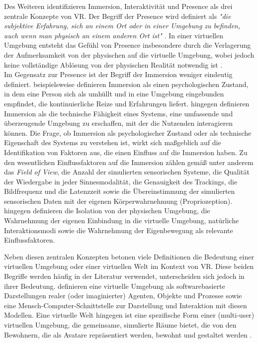 Des Weiteren identifizieren \citet{walsh_virtual_2002} Immersion, Interaktivität und Presence als drei zentrale Konzepte von VR. Der Begriff der Presence wird definiert als \textit{"die subjektive Erfahrung, sich an einem Ort oder in einer Umgebung zu befinden, auch wenn man physisch an einem anderen Ort ist"} \citep{witmer_measuring_1998}. In einer virtuellen Umgebung entsteht das Gefühl von Presence insbesondere durch die Verlagerung der Aufmerksamkeit von der physischen auf die virtuelle Umgebung, wobei jedoch keine vollständige Ablösung von der physischen Realität notwendig ist \citep{witmer_measuring_1998}. \\
Im Gegensatz zur Presence ist der Begriff der Immersion weniger eindeutig definiert. \citet{witmer_measuring_1998} beispielsweise definieren Immersion als einen psychologischen Zustand, in dem eine Person sich als umhüllt und in eine Umgebung eingebunden empfindet, die kontinuierliche Reize und Erfahrungen liefert. \citet{sanchez-vives_presence_2005} hingegen definieren Immersion als die technische Fähigkeit eines Systems, eine umfassende und überzeugende Umgebung zu erschaffen, mit der die Nutzenden interagieren können. 
Die Frage, ob Immersion als psychologischer Zustand oder als technische Eigenschaft des Systems zu verstehen ist, wirkt sich maßgeblich auf die Identifikation von Faktoren aus, die einen Einfluss auf die Immersion haben. 
Zu den wesentlichen Einflussfaktoren auf die Immersion zählen gemäß  \citet{sanchez-vives_presence_2005} unter anderem das \textit{Field of View}, die Anzahl der simulierten sensorischen Systeme, die Qualität der Wiedergabe in jeder Sinnesmodalität, die Genauigkeit des Trackings, die Bildfrequenz und die Latenzzeit sowie die Übereinstimmung der simulierten sensorischen Daten mit der eigenen Körperwahrnehmung (Propriozeption). \citet{witmer_measuring_1998} hingegen definieren die Isolation von der physischen Umgebung, die Wahrnehmung der eigenen Einbindung in die virtuelle Umgebung, natürliche Interaktionsmodi sowie die Wahrnehmung der Eigenbewegung als relevante Einflussfaktoren. 

Neben diesen zentralen Konzepten betonen viele Definitionen die Bedeutung einer virtuellen Umgebung oder einer virtuellen Welt im Kontext von VR. Diese beiden Begriffe werden häufig in der Literatur verwendet, unterscheiden sich jedoch in ihrer Bedeutung. \citet{10.5555/216164.216189} definieren eine virtuelle Umgebung als softwarebasierte Darstellungen realer (oder imaginierter) Agenten, Objekte und Prozesse sowie eine Mensch-Computer-Schnittstelle zur Darstellung und Interaktion mit diesen Modellen. Eine virtuelle Welt hingegen ist eine spezifische Form einer (multi-user) virtuellen Umgebung, die gemeinsame, simulierte Räume bietet, die von den Bewohnern, die als Avatare repräsentiert werden, bewohnt und gestaltet werden \citep{girvan_what_2018}.

